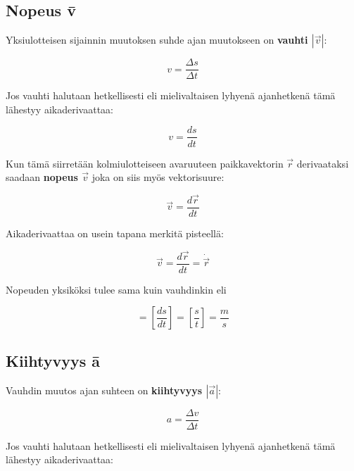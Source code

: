 \documentclass[12pt,a4paper,finnish]{book}
\begin{document}

\subsection{Nopeus \={v}}

Yksiulotteisen sijainnin muutoksen suhde ajan muutokseen on \textbf{vauhti $|\vec{v}|$}:

\begin{equation}
 v = \frac{\Delta s}{\Delta t}
\end{equation}

Jos vauhti halutaan hetkellisesti eli mielivaltaisen lyhyenä ajanhetkenä tämä lähestyy aikaderivaattaa:

\begin{equation}
 v = \frac{ds}{dt}
\end{equation}

Kun tämä siirretään kolmiulotteiseen avaruuteen paikkavektorin $\vec{r}$ derivaataksi saadaan \textbf{nopeus $\vec{v}$} 
joka on siis myös vektorisuure:

\begin{equation}
 \vec{v} = \frac{d\vec{r}}{dt}
\end{equation}

Aikaderivaattaa on usein tapana merkitä pisteellä:

\begin{equation}
 \vec{v} = \frac{d\vec{r}}{dt} = \dot{\vec{r}}
\end{equation}

Nopeuden yksiköksi tulee sama kuin vauhdinkin eli

\begin{equation}
 [v] = \left[\frac{ds}{dt}\right] = \left[\frac{s}{t}\right] = \frac{m}{s}
\end{equation}

\subsection{Kiihtyvyys \={a}}

Vauhdin muutos ajan suhteen on \textbf{kiihtyvyys $|\vec{a}|$}:

\begin{equation}
 a = \frac{\Delta v}{\Delta t}
\end{equation}

Jos vauhti halutaan hetkellisesti eli mielivaltaisen lyhyenä ajanhetkenä tämä lähestyy aikaderivaattaa:
\end{document}
